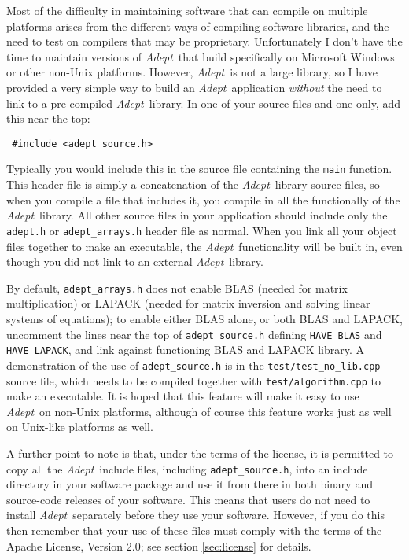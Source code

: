 \documentclass[a4,oneside]{book}
\def\codesize{\small}
\def\Adept{\emph{Adept}}
\def\code#1{{\codesize\texttt{#1}}}
\begin{document}
Most of the difficulty in maintaining software that can compile on
multiple platforms arises from the different ways of compiling
software libraries, and the need to test on compilers that may be
proprietary.  Unfortunately I don't have the time to maintain versions
of \Adept\ that build specifically on Microsoft Windows or other
non-Unix platforms.  However, \Adept\ is not a large library, so I
have provided a very simple way to build an \Adept\ application
\emph{without} the need to link to a pre-compiled \Adept\ library. In
one of your source files and one only, add this near the top:
\begin{lstlisting}
 #include <adept_source.h>
\end{lstlisting}
Typically you would include this in the source file containing the
\code{main} function.  This header file is simply a concatenation of
the \Adept\ library source files, so when you compile a file that
includes it, you compile in all the functionally of the
\Adept\ library. All other source files in your application should
include only the \code{adept.h} or \code{adept\_arrays.h} header file
as normal.  When you link all your object files together to make an
executable, the \Adept\ functionality will be built in, even though
you did not link to an external \Adept\ library.

By default, \code{adept\_arrays.h} does not enable BLAS (needed for
matrix multiplication) or LAPACK (needed for matrix inversion and
solving linear systems of equations); to enable either BLAS alone, or
both BLAS and LAPACK, uncomment the lines near the top of
\code{adept\_source.h} defining \code{HAVE\_BLAS} and
\code{HAVE\_LAPACK}, and link against functioning BLAS and LAPACK
library. A demonstration of the use of \code{adept\_source.h} is in
the \code{test/test\_no\_lib.cpp} source file, which needs to be
compiled together with \code{test/algorithm.cpp} to make an
executable.
%
It is hoped that this feature will make it easy to use \Adept\ on
non-Unix platforms, although of course this feature works just as well
on Unix-like platforms as well.

A further point to note is that, under the terms of the license, it is
permitted to copy all the \Adept\ include files, including
\code{adept\_source.h}, into an include directory in your software
package and use it from there in both binary and source-code releases
of your software. This means that users do not need to install
\Adept\ separately before they use your software.  However, if you do
this then remember that your use of these files must comply with the
terms of the Apache License, Version 2.0; see section
\ref{sec:license} for details.
%
\end{document}
